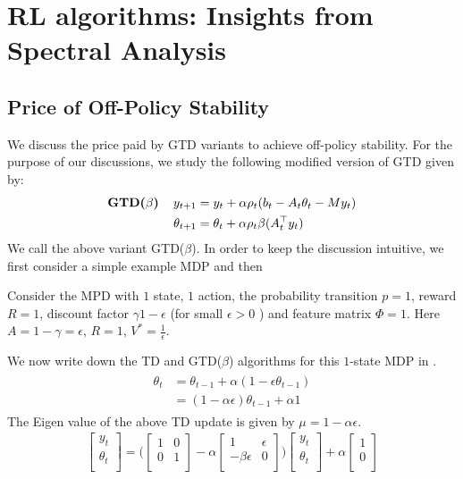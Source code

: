 \section{RL algorithms: Insights from Spectral Analysis}
\subsection{Price of Off-Policy Stability}
We discuss the price paid by GTD variants to achieve off-policy stability.
For the purpose of our discussions, we study the following modified version of GTD given by:
\begin{align}\label{gtdbeta}
\begin{split}
\textbf{GTD($\beta$)\quad}y_{t+1}&=y_t+\alpha \rho_t(b_t-A_t\theta_t - M y_t)\\
\theta_{t+1}&=\theta_t+\alpha\rho_t\beta(A^\top_ty_t)
\end{split}
\end{align}
We call the above variant GTD($\beta$).
In order to keep the discussion intuitive, we first consider a simple example MDP and then
\begin{example}\label{onestatemdp}
Consider the MPD with $1$ state, $1$ action, the probability transition $p=1$, reward $R=1$, discount factor $\gamma 1-\epsilon$ (for small $\epsilon>0$ ) and feature matrix $\Phi=1$. Here $A=1-\gamma=\epsilon$, $R=1$, $V^*=\frac{1}{\epsilon}$.
\end{example}
We now write down the TD and GTD($\beta$) algorithms for this $1$-state MDP in .
\begin{align}\label{tdonestate}
\begin{split}
\theta_{t}&=\theta_{t-1}+\alpha(1-\epsilon\theta_{t-1})\\
&=(1-\alpha\epsilon)\theta_{t-1}+\alpha 1
\end{split}
\end{align}
The Eigen value of the above TD update is given by $\mu=1-\alpha\epsilon$.
\begin{align}\label{gtdonestate}
\begin{bmatrix} y_t \\ \theta_t\\\end{bmatrix}=\Big(\begin{bmatrix} 1&0 \\ 0& 1\\\end{bmatrix} - \alpha\begin{bmatrix} 1&\epsilon \\ -\beta\epsilon& 0\\\end{bmatrix}\Big)\begin{bmatrix} y_t \\ \theta_t\\\end{bmatrix}+\alpha\begin{bmatrix} 1 \\ 0\\\end{bmatrix}
\end{align}
